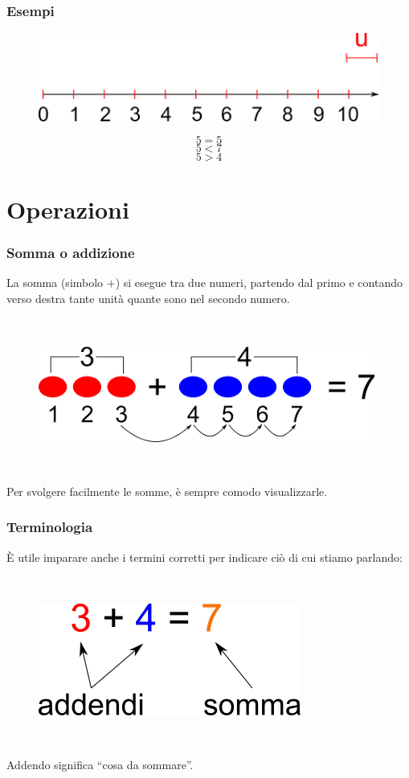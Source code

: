 \documentclass[handout]{beamer}
\theoremstyle{plain}
\begin{document}
\begin{frame}
\frametitle{Esempi}
\begin{figure}
  \includegraphics[width=.6\columnwidth]{img/naturali.png}
\end{figure}

\[ 5 = 5 \]\pause
\[ 5 < 7 \]\pause
\[ 5 > 4 \]\pause
\end{frame}

\section{Operazioni}

\begin{frame}
\frametitle{Somma o addizione}
La somma (simbolo $ + $) si esegue tra due numeri, partendo dal primo e contando verso destra tante unità quante sono nel secondo numero.

~
\begin{figure}
  \includegraphics[width=.8\columnwidth]{img/somma.png}
\end{figure}

~

Per svolgere facilmente le somme, è sempre comodo \alert{visualizzarle}.
\end{frame}

\begin{frame}
\frametitle{Terminologia}
È utile imparare anche i termini corretti per indicare ciò di cui stiamo parlando:

~

\begin{figure}
  \includegraphics[width=.5\columnwidth]{img/somma2.png}
\end{figure}

~

Addendo significa ``cosa da sommare''.
\end{frame}
\end{document}
